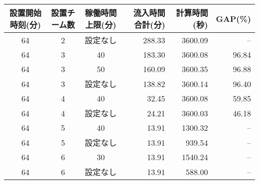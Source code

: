 \documentclass[14pt,dvipdfmx]{beamer}
\newcommand{\backupend}{
  \addtocounter{framenumberappendix}{-\value{framenumber}}
  \addtocounter{framenumber}{\value{framenumberappendix}} 
}
\begin{document}
{\begin{table}
\begin{center}
{\begin{tabular}{ccc|r|rr}
  設置開始時刻(分) & 設置チーム数 & 稼働時間上限(分) & 流入時間合計(分) & 計算時間(秒) & GAP(\%) \\ \hline
  64 & 2 & 設定なし & 288.33 & 3600.09 & -- \\ \hline
  64 & 3 & 40       & 183.30 & 3600.08 & 96.84 \\ \hline
  64 & 3 & 50       & 160.09 & 3600.35 & 96.88 \\ \hline
  64 & 3 & 設定なし & 138.82 & 3600.14 & 96.40 \\ \hline
  64 & 4 & 40       & 32.45  & 3600.08 & 59.85 \\ \hline
  64 & 4 & 設定なし & 24.21  & 3600.03 & 46.18 \\ \hline
  64 & 5 & 40       & 13.91  & 1300.32 & -- \\ \hline
  64 & 5 & 設定なし & 13.91  & 939.54  & -- \\ \hline
  64 & 6 & 30       & 13.91  & 1540.24 & -- \\ \hline
  64 & 6 & 設定なし & 13.91  & 588.00  & -- \\ \hline
 \end{tabular}
}
\end{center}
\end{table}
}




\backupend
\end{document}
